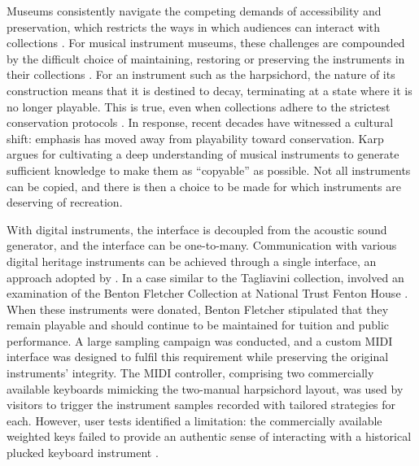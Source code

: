 
Museums consistently navigate the competing demands of accessibility and
preservation, which restricts the ways in which audiences can interact with
collections \cite{templeton_museum_2018, mcalpine_sampling_2014}. 
For musical instrument museums, these challenges are compounded by the 
difficult choice of maintaining, restoring or preserving the instruments in their collections \cite{barclay_critical_1999,barclay_preservation_2005}. 
For an instrument such as the harpsichord, the nature of its construction means that it is destined to decay, terminating at a
state where it is no longer playable. This is true, even when collections adhere to the
strictest conservation protocols \cite{paradiso_to-save_2019}. In response,
recent decades have witnessed a cultural shift: emphasis has moved away from
playability toward conservation. Karp \cite{karp_restoration_1979, karp_musical_1985} argues for cultivating a deep understanding of musical instruments to generate sufficient knowledge to make
them as ``copyable'' as possible. Not all instruments can be copied, and there is then a choice to be made for which instruments are deserving of recreation. 

With digital instruments, the interface is decoupled from the acoustic sound generator, and the interface can be one-to-many. Communication with various digital heritage instruments can be achieved through a single interface, an approach adopted by \textcite{mcalpine_sampling_2014}. In a case similar to the Tagliavini collection, \textcite{mcalpine_sampling_2014} involved an
examination of the Benton Fletcher Collection at National Trust Fenton House
\cite{mcalpine_sampling_2014}. When these instruments were donated, Benton
Fletcher stipulated that they remain playable and should continue to be
maintained for tuition and public performance. A large sampling campaign was
conducted, and a custom MIDI interface was designed to fulfil this requirement
while preserving the original instruments' integrity. The MIDI controller,
comprising two commercially available keyboards mimicking the two-manual
harpsichord layout, was used by visitors to trigger the instrument samples
recorded with tailored strategies for each. However, user tests identified a
limitation: the commercially available weighted keys failed to provide an
authentic sense of interacting with a historical plucked keyboard instrument
\cite{mcalpine_sampling_2014}. 

